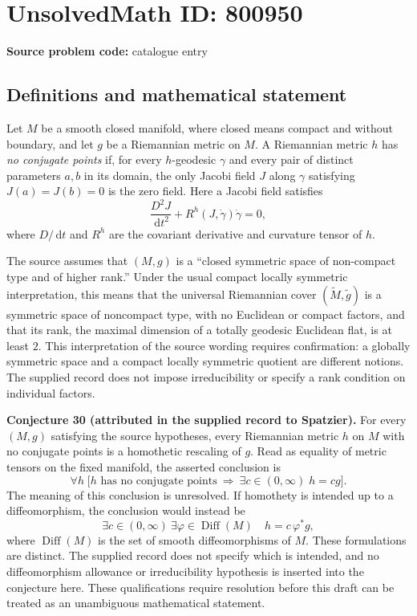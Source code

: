 \documentclass[11pt]{article}
\newcommand{\dd}{\,\mathrm{d}}
\begin{document}
\section*{UnsolvedMath ID: 800950}
\textbf{Source problem code:} catalogue entry
\subsection{Definitions and mathematical statement}
Let \(M\) be a smooth closed manifold, where closed means compact and without boundary, and let \(g\) be a Riemannian metric on \(M\). A Riemannian metric \(h\) has \emph{no conjugate points} if, for every \(h\)-geodesic \(\gamma\) and every pair of distinct parameters \(a,b\) in its domain, the only Jacobi field \(J\) along \(\gamma\) satisfying \(J(a)=J(b)=0\) is the zero field. Here a Jacobi field satisfies
\[
\frac{D^2J}{\dd t^2}+R^h(J,\dot\gamma)\dot\gamma=0,
\]
where \(D/\dd t\) and \(R^h\) are the covariant derivative and curvature tensor of \(h\).

The source assumes that \((M,g)\) is a ``closed symmetric space of non-compact type and of higher rank.'' Under the usual compact locally symmetric interpretation, this means that the universal Riemannian cover \((\widetilde M,\widetilde g)\) is a symmetric space of noncompact type, with no Euclidean or compact factors, and that its rank, the maximal dimension of a totally geodesic Euclidean flat, is at least \(2\). This interpretation of the source wording requires confirmation: a globally symmetric space and a compact locally symmetric quotient are different notions. The supplied record does not impose irreducibility or specify a rank condition on individual factors.

\textbf{Conjecture 30 (attributed in the supplied record to Spatzier).} For every \((M,g)\) satisfying the source hypotheses, every Riemannian metric \(h\) on \(M\) with no conjugate points is a homothetic rescaling of \(g\). Read as equality of metric tensors on the fixed manifold, the asserted conclusion is
\[
\forall h\;\bigl[h\text{ has no conjugate points}\ \Longrightarrow\ \exists c\in(0,\infty)\;h=cg\bigr].
\]
The meaning of this conclusion is unresolved. If homothety is intended up to a diffeomorphism, the conclusion would instead be
\[
\exists c\in(0,\infty)\ \exists\varphi\in\operatorname{Diff}(M)
\quad h=c\,\varphi^*g,
\]
where \(\operatorname{Diff}(M)\) is the set of smooth diffeomorphisms of \(M\). These formulations are distinct. The supplied record does not specify which is intended, and no diffeomorphism allowance or irreducibility hypothesis is inserted into the conjecture here. These qualifications require resolution before this draft can be treated as an unambiguous mathematical statement.
\end{document}
